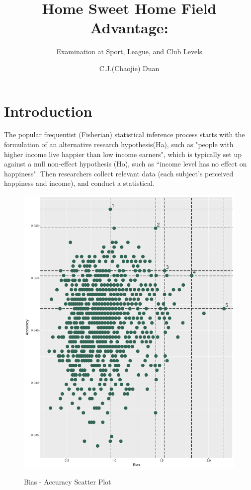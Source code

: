 \documentclass[USenglish]{article}
\begin{document}

  \author*[1]{C.J.(Chaojie) Duan}
  \title{Home Sweet Home Field Advantage:}
  \subtitle{Examination at Sport, League, and Club Levels}
\maketitle

\section{Introduction} 

The popular frequentist (Fisherian) statistical inference process starts with the formulation of an alternative research hypothesis(Ha), such as "people with higher income live happier than low income earners", which is typically set up against a null non-effect hypothesis (Ho), such as ``income level has no effect on happiness". Then researchers collect relevant data (each subject's perceived happiness and income), and conduct a statistical. \citep{Gajewski2006}


\begin{figure}
\caption{Bias - Accuracy Scatter Plot}
{\includegraphics[width=0.65\linewidth]{Rplot04.pdf}}
\label{fig1}
\end{figure}
\end{document}
